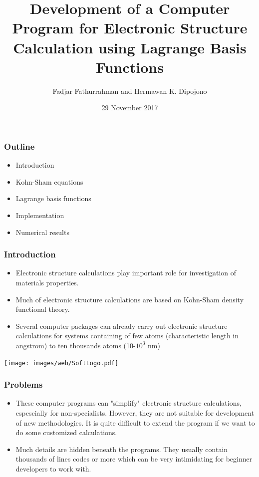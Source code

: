 \documentclass[10pt,t]{beamer}
\begin{document}
\title{Development of a Computer Program for Electronic Structure
Calculation using Lagrange Basis Functions}
\author{Fadjar Fathurrahman and Hermawan K. Dipojono}
\date{29 November 2017}

\frame{\titlepage}

\begin{frame}[c]
\frametitle{Outline}

\begin{itemize}
\item Introduction
\item Kohn-Sham equations
\item Lagrange basis functions
\item Implementation
\item Numerical results
\end{itemize}

\end{frame}

\begin{frame}[c]
\frametitle{Introduction}

\begin{itemize}
\item Electronic structure calculations play important role for investigation of materials
properties.
\item Much of electronic structure calculations are based on Kohn-Sham density functional theory.
\item Several computer packages can already carry out electronic structure calculations
for systems containing of few atoms (characteristic length in angstrom) to ten thousands atoms
(10-$10^3$ nm)
\end{itemize}

{\centering
\texttt{[image: images/web/SoftLogo.pdf]}
\par}

\end{frame}


\begin{frame}[c]
\frametitle{Problems}

\begin{itemize}
\item These computer programs can "simplify" electronic structure calculations,
espescially for non-specialists.
However, they are not suitable for development of new methodologies.
It is quite difficult to extend the program if we want to do some customized calculations.
\item Much details are hidden beneath the programs. They usually contain thousands of lines codes
or more which can be very intimidating for beginner developers to work with.
\end{itemize}

\end{frame}
\end{document}
